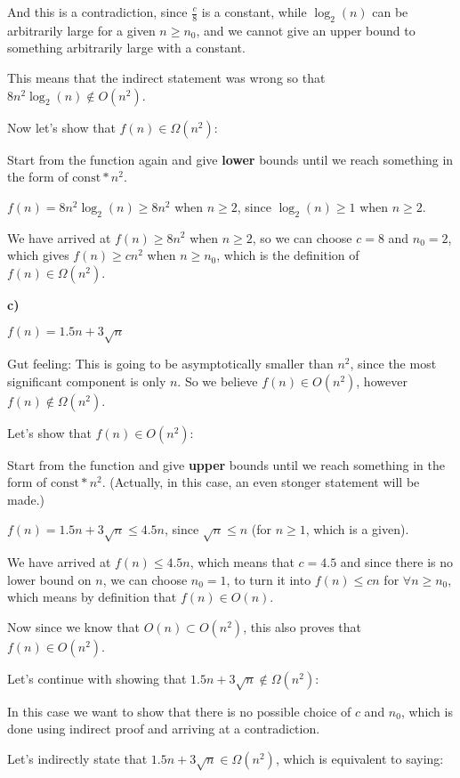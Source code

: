 And this is a contradiction, since $\frac{c}{8}$ is a constant, while $\log_2(n)$ can be arbitrarily large for a given $n\geq{}n_0$, and we cannot give an upper bound to something arbitrarily large with a constant.

This means that the indirect statement was wrong so that $8n^2\log_2(n)\notin{}O(n^2)$.

Now let's show that $f(n)\in{}\Omega(n^2)$:

Start from the function again and give \textbf{lower} bounds until we reach something in the form of $\text{const}*n^2$.

$f(n) = 8n^2\log_2(n) \geq{} 8n^2$ when $n\geq{}2$, since $\log_2(n) \geq{} 1$ when $n\geq{}2$.

We have arrived at $f(n) \geq{} 8n^2$ when $n\geq{}2$, so we can choose $c=8$ and $n_0=2$, which gives $f(n) \geq{} cn^2$ when $n\geq{}n_0$, which is the definition of $f(n)\in{}\Omega(n^2)$.

\textbf{c)}

$f(n) = 1.5n + 3\sqrt{n}$

Gut feeling: This is going to be asymptotically smaller than $n^2$, since the most significant component is only $n$. So we believe $f(n)\in{}O(n^2)$, however $f(n)\notin{}\Omega(n^2)$.

Let's show that $f(n)\in{}O(n^2)$:

Start from the function and give \textbf{upper} bounds until we reach something in the form of $\text{const}*n^2$. (Actually, in this case, an even stonger statement will be made.)

$f(n) = 1.5n + 3\sqrt{n} \leq{} 4.5n$, since $\sqrt{n} \leq{} n$ (for $n\geq{}1$, which is a given).

We have arrived at $f(n) \leq{} 4.5n$, which means that $c=4.5$ and since there is no lower bound on $n$, we can choose $n_0=1$, to turn it into $f(n) \leq{} cn$ for $\forall{}n\geq{}n_0$, which means by definition that $f(n)\in{}O(n)$. 

Now since we know that $O(n)\subset{}O(n^2)$, this also proves that $f(n)\in{}O(n^2)$.

Let's continue with showing that $1.5n + 3\sqrt{n}\notin{}\Omega(n^2)$:

In this case we want to show that there is no possible choice of $c$ and $n_0$, which is done using indirect proof and arriving at a contradiction.

Let's indirectly state that $1.5n + 3\sqrt{n}\in{}\Omega(n^2)$, which is equivalent to saying:

